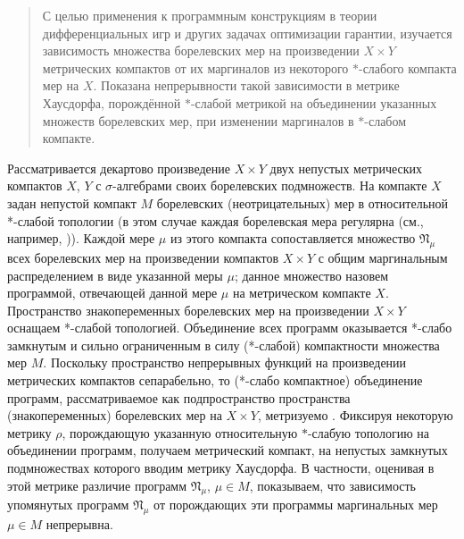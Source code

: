 \begin{abstract}
С целью применения к программным конструкциям в теории дифференциальных игр и других задачах оптимизации гарантии, изучается зависимость множества борелевских мер на произведении $X\times Y$ метрических компактов от их маргиналов из некоторого $*$-слабого компакта мер на $X$.
Показана непрерывности такой зависимости в метрике Хаусдорфа, порождённой $*$-слабой метрикой на объединении указанных множеств борелевских мер, при изменении маргиналов в $*$-слабом компакте.

\end{abstract}


Рассматривается декартово произведение $X\times Y$ двух непустых метрических компактов $X$, $Y$ с $\sigma$-алгебрами своих борелевских подмножеств.
На компакте $X$ задан непустой компакт $M$ борелевских (неотрицательных) мер в относительной *-слабой топологии (в этом случае каждая борелевская мера регулярна (см., например, \cite[гл. 1. \S1]{Bil})).
Каждой мере $\mu$ из этого компакта сопоставляется множество $\mathfrak{N}_\mu$ всех борелевских мер на произведении компактов $X\times Y$ с общим маргинальным распределением в виде указанной меры $\mu$;
данное множество назовем программой, отвечающей данной мере $\mu$ на метрическом компакте $X$.
Пространство знакопеременных борелевских мер на произведении $X\times Y$ оснащаем *-слабой топологией.
Объединение всех программ оказывается *-слабо замкнутым и сильно ограниченным в силу (*-слабой) компактности множества мер $M$.
Поскольку пространство непрерывных функций на произведении метрических компактов сепарабельно, то (*-слабо компактное) объединение программ, рассматриваемое как подпространство пространства (знакопеременных) борелевских мер на $X\times Y$, метризуемо \cite[Теорема 1.3.12]{Warga}.
Фиксируя некоторую метрику $\rho$, порождающую указанную относительную $*$-слабую топологию на объединении программ, получаем метрический компакт, на непустых замкнутых подмножествах которого вводим метрику Хаусдорфа.
В частности, оценивая в этой метрике различие программ $\mathfrak{N}_\mu$, $\mu\in M$, показываем, что зависимость упомянутых программ $\mathfrak{N}_\mu$ от порождающих эти программы маргинальных мер $\mu\in M$ непрерывна.

